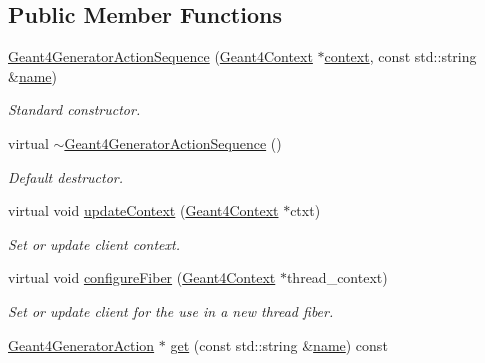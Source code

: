 \subsection*{Public Member Functions}
\begin{DoxyCompactItemize}
\item 
\hyperlink{class_d_d4hep_1_1_simulation_1_1_geant4_generator_action_sequence_a6a4cf73b83a5ad8f5fb5d2101511dc89}{Geant4\+Generator\+Action\+Sequence} (\hyperlink{class_d_d4hep_1_1_simulation_1_1_geant4_context}{Geant4\+Context} $\ast$\hyperlink{class_d_d4hep_1_1_simulation_1_1_geant4_action_aa9d87f0ec2a72b7fc2591b18f98d75cf}{context}, const std\+::string \&\hyperlink{class_d_d4hep_1_1_simulation_1_1_geant4_action_af374e70b014d16afb81dd9d77cc3894b}{name})
\begin{DoxyCompactList}\small\item\em Standard constructor. \end{DoxyCompactList}\item 
virtual \hyperlink{class_d_d4hep_1_1_simulation_1_1_geant4_generator_action_sequence_a69d6b2986aeafa1e9951700f4d023455}{$\sim$\+Geant4\+Generator\+Action\+Sequence} ()
\begin{DoxyCompactList}\small\item\em Default destructor. \end{DoxyCompactList}\item 
virtual void \hyperlink{class_d_d4hep_1_1_simulation_1_1_geant4_generator_action_sequence_a52b0d18dd3c29e1b1e133d9e1c73284b}{update\+Context} (\hyperlink{class_d_d4hep_1_1_simulation_1_1_geant4_context}{Geant4\+Context} $\ast$ctxt)
\begin{DoxyCompactList}\small\item\em Set or update client context. \end{DoxyCompactList}\item 
virtual void \hyperlink{class_d_d4hep_1_1_simulation_1_1_geant4_generator_action_sequence_a0ba4324a4f977eb12057e789eaf44f07}{configure\+Fiber} (\hyperlink{class_d_d4hep_1_1_simulation_1_1_geant4_context}{Geant4\+Context} $\ast$thread\+\_\+context)
\begin{DoxyCompactList}\small\item\em Set or update client for the use in a new thread fiber. \end{DoxyCompactList}\item 
\hyperlink{class_d_d4hep_1_1_simulation_1_1_geant4_generator_action}{Geant4\+Generator\+Action} $\ast$ \hyperlink{class_d_d4hep_1_1_simulation_1_1_geant4_generator_action_sequence_ae304cfc52197b4c0c95e38ffe072a801}{get} (const std\+::string \&\hyperlink{class_d_d4hep_1_1_simulation_1_1_geant4_action_af374e70b014d16afb81dd9d77cc3894b}{name}) const

\end{DoxyCompactItemize}
